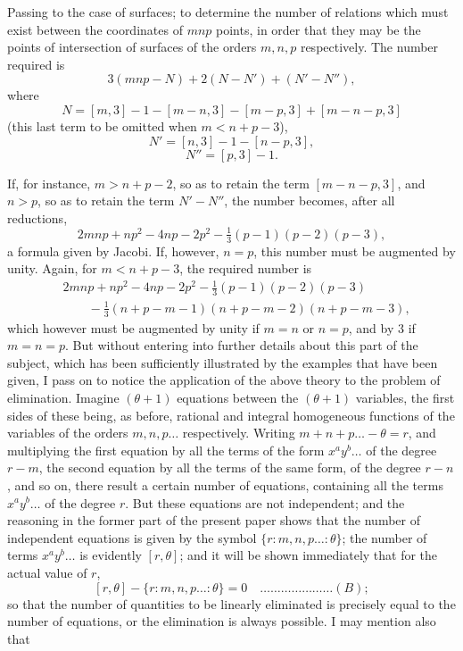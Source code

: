 \documentclass[11pt]{article}
\begin{document}
Passing to the case of surfaces; to determine the number of relations which must exist between the coordinates of $mnp$ points, in order that they may be the points of intersection of surfaces of the orders $m, n, p$ respectively. The number required is
\[
3(mnp - N) + 2(N - N') + (N' - N''),
\]
where
\[
N = [m, 3] - 1 - [m - n, 3] - [m - p, 3] + [m - n - p, 3]
\]
(this last term to be omitted when $m < n + p - 3$),
\[
N' = [n, 3] - 1 - [n - p, 3],
\]
\[
N'' = [p, 3] - 1.
\]

If, for instance, $m > n + p - 2$, so as to retain the term $[m - n - p, 3]$, and $n > p$, so as to retain the term $N' - N''$, the number becomes, after all reductions,
\[
2mnp + np^2 - 4np - 2p^2 - \tfrac13 (p - 1)(p - 2)(p - 3),
\]
a formula given by Jacobi. If, however, $n = p$, this number must be augmented by unity. Again, for $m < n + p - 3$, the required number is
\begin{align*}
& 2mnp + np^2 - 4np - 2p^2 - \tfrac13 (p - 1)(p - 2)(p - 3)\\
& \qquad - \tfrac13 (n + p - m - 1)(n + p - m - 2)(n + p - m - 3),
\end{align*}
which however must be augmented by unity if $m = n$ or $n = p$, and by $3$ if $m = n = p$. But without entering into further details about this part of the subject, which has been sufficiently illustrated by the examples that have been given, I pass on to notice the application of the above theory to the problem of elimination. Imagine $(\theta + 1)$ equations between the $(\theta + 1)$ variables, the first sides of these being, as before, rational and integral homogeneous functions of the variables of the orders $m, n, p \ldots$ respectively. Writing $m + n + p \ldots - \theta = r$, and multiplying the first equation by all the terms of the form $x^a y^b \ldots$ of the degree $r - m$, the second equation by all the terms of the same form, of the degree $r - n$, and so on, there result a certain number of equations, containing all the terms $x^a y^b \ldots$ of the degree $r$. But these equations are not independent; and the reasoning in the former part of the present paper shows that the number of independent equations is given by the symbol $\{r : m, n, p \ldots : \theta\}$; the number of terms $x^a y^b \ldots$ is evidently $[r, \theta]$; and it will be shown immediately that for the actual value of $r$,
\[
[r, \theta] - \{r : m, n, p \ldots : \theta\} = 0 \quad \ldots\ldots\ldots\ldots\ldots\ldots\ldots (B);
\]
so that the number of quantities to be linearly eliminated is precisely equal to the number of equations, or the elimination is always possible. I may mention also that
\end{document}
